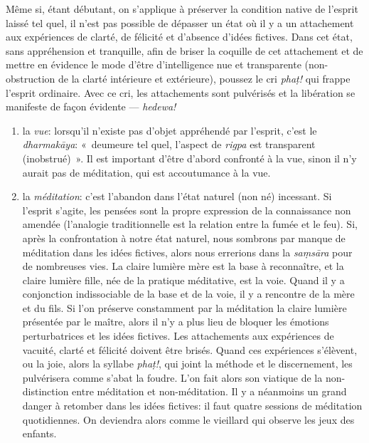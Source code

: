 \documentclass[a4paper]{article}
\begin{document}
Même si, étant débutant, on s'applique à préserver la condition native
de l'esprit laissé tel quel, il n'est pas possible de dépasser un état
où il y a un attachement aux expériences de clarté, de félicité et
d'absence d'idées fictives. Dans cet état, sans appréhension et
tranquille, afin de briser la coquille de cet attachement et de mettre
en évidence le mode d'être d'intelligence nue et transparente
(non-obstruction de la clarté intérieure et extérieure), poussez le
cri \emph{pha\d{t}!} qui frappe l'esprit ordinaire. Avec ce cri, les
attachements sont pulvérisés et la libération se manifeste de façon
évidente --- \emph{hedewa!}

\begin{enumerate}

  \item la \emph{vue}: lorsqu'il n'existe pas d'objet appréhendé par
        l'esprit, c'est le \emph{dharmak\={a}ya}: «~deumeure tel quel,
        l'aspect de \emph{rigpa} est transparent (inobstrué)~». Il est
        important d'être d'abord confronté à la vue, sinon il n'y
        aurait pas de méditation, qui est accoutumance à la vue.

  \item la \emph{méditation}: c'est l'abandon dans l'état naturel (non
        né) incessant. Si l'esprit s'agite, les pensées sont la propre
        expression de la connaissance non amendée (l'analogie
        traditionnelle est la relation entre la fumée et le feu). Si,
        après la confrontation à notre état naturel, nous sombrons par
        manque de méditation dans les idées fictives, alors nous
        errerions dans la \emph{sa\d{m}s\={a}ra} pour de nombreuses
        vies. La claire lumière mère est la base à reconnaître, et la
        claire lumière fille, née de la pratique méditative, est la
        voie. Quand il y a conjonction indissociable de la base et de
        la voie, il y a rencontre de la mère et du fils. Si l'on
        préserve constamment par la méditation la claire lumière
        présentée par le maître, alors il n'y a plus lieu de bloquer
        les émotions perturbatrices et les idées fictives. Les
        attachements aux expériences de vacuité, clarté et félicité
        doivent être brisés. Quand ces expériences s'élèvent, ou la
        joie, alors la syllabe \emph{pha\d{t}!}, qui joint la méthode
        et le discernement, les pulvérisera comme s'abat la
        foudre. L'on fait alors son viatique de la non-distinction
        entre méditation et non-méditation. Il y a néanmoins un grand
        danger à retomber dans les idées fictives: il faut quatre
        sessions de méditation quotidiennes. On deviendra alors comme
        le vieillard qui observe les jeux des enfants.

\end{enumerate}
\end{document}
